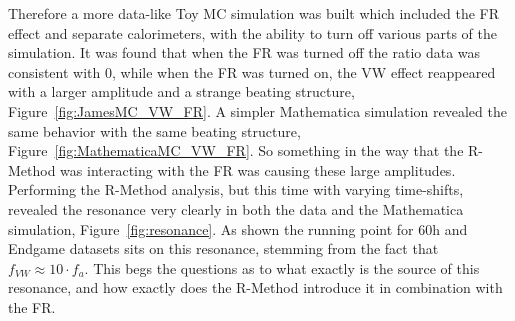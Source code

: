 \documentclass[12pt,letterpaper]{article}
\newcommand{\figref}[1]{Figure~\ref{#1}}
\begin{document}
Therefore a more data-like Toy MC simulation was built which included the FR effect and separate calorimeters, with the ability to turn off various parts of the simulation. It was found that when the FR was turned off the ratio data was consistent with 0, while when the FR was turned on, the VW effect reappeared with a larger amplitude and a strange beating structure, \figref{fig:JamesMC_VW_FR}. A simpler Mathematica simulation revealed the same behavior with the same beating structure, \figref{fig:MathematicaMC_VW_FR}. So something in the way that the R-Method was interacting with the FR was causing these large amplitudes. Performing the R-Method analysis, but this time with varying time-shifts, revealed the resonance very clearly in both the data and the Mathematica simulation, \figref{fig:resonance}. As shown the running point for 60h and Endgame datasets sits on this resonance, stemming from the fact that $f_{VW} \approx 10 \cdot f_{a}$. This begs the questions as to what exactly is the source of this resonance, and how exactly does the R-Method introduce it in combination with the FR.
\end{document}
